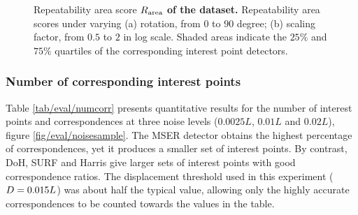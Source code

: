 \begin{figure}[ht]
\begin{subfigure}[t]{0.49\linewidth}
		\label{fig/eval/graph_scaling}
	\end{subfigure}
	\caption{Repeatability area score \textbf{$R_\textrm{area}$ of the \meshset dataset.} Repeatability area scores under varying (a) rotation, from $0$ to $90$ degree; (b) scaling factor, from $0.5$ to $2$ in log scale. Shaded areas indicate the $25\%$ and $75\%$ quartiles of the corresponding interest point detectors.  }
	\label{fig/eval/graph_graph1} 
\end{figure}

\subsubsection{Number of corresponding interest points}

Table \ref{tab/eval/numcorr} presents quantitative results for the number of interest points and correspondences at three noise levels ($0.0025L$, $0.01L$ and $0.02L$), \cf figure \ref{fig/eval/noisesample}.
The MSER detector obtains the highest percentage of correspondences, yet it produces a smaller set of interest points. By contrast, DoH, SURF and Harris give larger sets of interest points with good correspondence ratios. The displacement threshold used in this experiment ($D = 0.015L$) was about half the typical value, allowing only the highly accurate correspondences to be counted towards the values in the table. 

